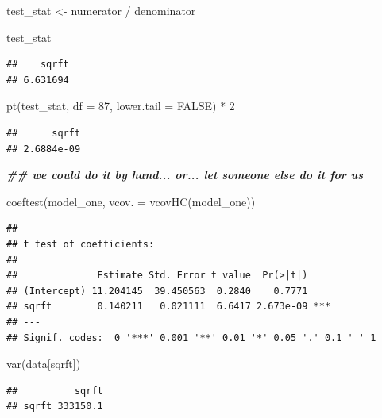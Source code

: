 \documentclass[
]{book}
\newenvironment{Shaded}{\begin{snugshade}}{\end{snugshade}}
\newcommand{\AttributeTok}[1]{\textcolor[rgb]{0.77,0.63,0.00}{#1}}
\newcommand{\ConstantTok}[1]{\textcolor[rgb]{0.00,0.00,0.00}{#1}}
\newcommand{\DecValTok}[1]{\textcolor[rgb]{0.00,0.00,0.81}{#1}}
\newcommand{\DocumentationTok}[1]{\textcolor[rgb]{0.56,0.35,0.01}{\textbf{\textit{#1}}}}
\newcommand{\FunctionTok}[1]{\textcolor[rgb]{0.00,0.00,0.00}{#1}}
\newcommand{\NormalTok}[1]{#1}
\newcommand{\OtherTok}[1]{\textcolor[rgb]{0.56,0.35,0.01}{#1}}
\newcommand{\SpecialCharTok}[1]{\textcolor[rgb]{0.00,0.00,0.00}{#1}}
\newcommand{\StringTok}[1]{\textcolor[rgb]{0.31,0.60,0.02}{#1}}
\theoremstyle{definition}
\theoremstyle{definition}
\theoremstyle{definition}
\theoremstyle{definition}
\theoremstyle{remark}
\begin{document}
\begin{Shaded}
\begin{Highlighting}[]
\NormalTok{test\_stat }\OtherTok{\textless{}{-}}\NormalTok{ numerator }\SpecialCharTok{/}\NormalTok{ denominator}

\NormalTok{test\_stat}
\end{Highlighting}
\end{Shaded}

\begin{verbatim}
##    sqrft 
## 6.631694
\end{verbatim}

\begin{Shaded}
\begin{Highlighting}[]
\FunctionTok{pt}\NormalTok{(test\_stat, }\AttributeTok{df =} \DecValTok{87}\NormalTok{, }\AttributeTok{lower.tail =} \ConstantTok{FALSE}\NormalTok{) }\SpecialCharTok{*} \DecValTok{2}
\end{Highlighting}
\end{Shaded}

\begin{verbatim}
##      sqrft 
## 2.6884e-09
\end{verbatim}

\begin{Shaded}
\begin{Highlighting}[]
\DocumentationTok{\#\# we could do it by hand... or... let someone else do it for us}

\FunctionTok{coeftest}\NormalTok{(model\_one, }\AttributeTok{vcov. =} \FunctionTok{vcovHC}\NormalTok{(model\_one))}
\end{Highlighting}
\end{Shaded}

\begin{verbatim}
## 
## t test of coefficients:
## 
##              Estimate Std. Error t value  Pr(>|t|)    
## (Intercept) 11.204145  39.450563  0.2840    0.7771    
## sqrft        0.140211   0.021111  6.6417 2.673e-09 ***
## ---
## Signif. codes:  0 '***' 0.001 '**' 0.01 '*' 0.05 '.' 0.1 ' ' 1
\end{verbatim}

\begin{Shaded}
\begin{Highlighting}[]
\FunctionTok{var}\NormalTok{(data[}\StringTok{\textquotesingle{}sqrft\textquotesingle{}}\NormalTok{]) }
\end{Highlighting}
\end{Shaded}

\begin{verbatim}
##          sqrft
## sqrft 333150.1
\end{verbatim}
\end{document}

